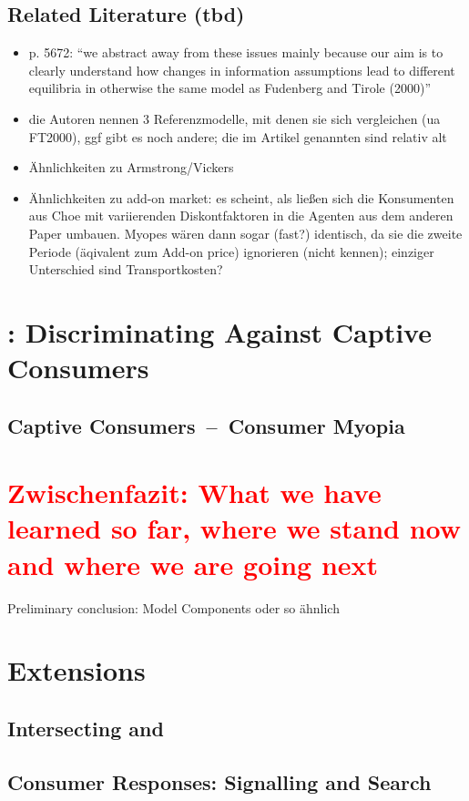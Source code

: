 \documentclass[a4paper, 11 pt, fleqn]{article}
\begin{document}
\subsection{Related Literature (tbd)}
\begin{itemize}
	\item p. 5672: ``we abstract away from these issues mainly because our aim is to clearly understand how changes in information assumptions lead to different equilibria
	in otherwise the same model as Fudenberg and Tirole (2000)''
	\item die Autoren nennen 3 Referenzmodelle, mit denen sie sich vergleichen (ua FT2000), ggf gibt es noch andere; die im Artikel genannten sind relativ alt
	\item Ähnlichkeiten zu Armstrong/Vickers
	\item Ähnlichkeiten zu add-on market: es scheint, als ließen sich die Konsumenten aus Choe mit variierenden Diskontfaktoren in die Agenten aus dem anderen Paper umbauen. Myopes wären dann sogar (fast?) identisch, da sie die zweite Periode (äqivalent zum Add-on price) ignorieren (nicht kennen); einziger Unterschied sind Transportkosten?
\end{itemize}
%
\section{\citet{Armstrong.2019}: Discriminating Against Captive Consumers}
%
\subsection{Captive Consumers~--~Consumer Myopia}
%
\section{\textcolor{red}{Zwischenfazit: What we have learned so far, where we stand now and where we are going next}}
Preliminary conclusion: Model Components oder so ähnlich
%
\section{Extensions} \label{sec:choe-extensions}
%
\subsection{Intersecting \citet{Choe.2018} and \citet{Armstrong.2019}}
%
\subsection{Consumer Responses: Signalling and Search}
%
\end{document}
